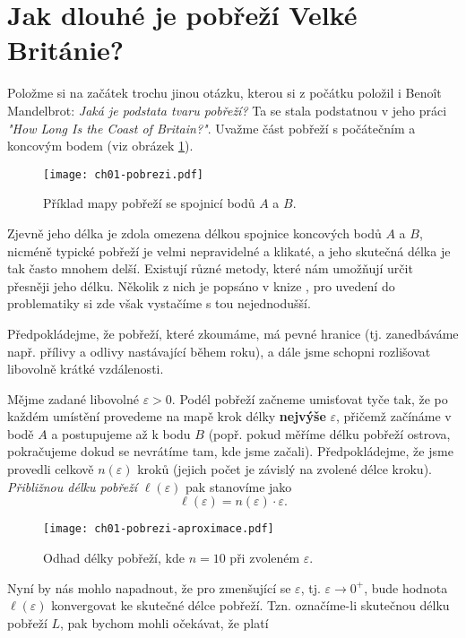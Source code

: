 \section{Jak dlouhé je pobřeží Velké Británie?}\label{sec:pobrezi_velke_britanie}
Položme si na začátek trochu jinou otázku, kterou si z počátku položil i Benoît Mandelbrot: \emph{Jaká je podstata tvaru pobřeží?} Ta se stala podstatnou v jeho práci \emph{"How Long Is the Coast of Britain?"}. Uvažme část pobřeží s počátečním a koncovým bodem (viz obrázek \ref{fig:pobrezi}).
\begin{figure}[h]
    \centering
    \texttt{[image: ch01-pobrezi.pdf]}
    \caption{Příklad mapy pobřeží se spojnicí bodů $A$ a $B$.}
    \label{fig:pobrezi}
\end{figure}
Zjevně jeho délka je zdola omezena délkou spojnice koncových bodů $A$ a $B$, nicméně typické pobřeží je velmi nepravidelné a klikaté, a jeho skutečná délka je tak často mnohem delší. Existují různé metody, které nám umožňují určit přesněji jeho délku. Několik z nich je popsáno v knize \citep[str. 79]{Mandelbrot1983}, pro uvedení do problematiky si zde však vystačíme s tou nejednodušší.\par
Předpokládejme, že pobřeží, které zkoumáme, má pevné hranice (tj. zanedbáváme např. přílivy a odlivy nastávající během roku), a dále jsme schopni rozlišovat libovolně krátké vzdálenosti.\par
Mějme zadané libovolné $\varepsilon>0$. Podél pobřeží začneme umisťovat tyče tak, že po každém umístění provedeme na mapě krok délky \textbf{nejvýše} $\varepsilon$, přičemž začínáme v bodě $A$ a postupujeme až k bodu $B$ (popř. pokud měříme délku pobřeží ostrova, pokračujeme dokud se nevrátíme tam, kde jsme začali). Předpokládejme, že jsme provedli celkově $n(\varepsilon)$ kroků (jejich počet je závislý na zvolené délce kroku). \emph{Přibližnou délku pobřeží} $\ell(\varepsilon)$ pak stanovíme jako
\begin{equation*}
    \ell(\varepsilon)=n(\varepsilon)\cdot\varepsilon.
\end{equation*}
\begin{figure}[h]
    \centering
    \texttt{[image: ch01-pobrezi-aproximace.pdf]}
    \caption{Odhad délky pobřeží, kde $n=10$ při zvoleném $\varepsilon$.}
    \label{fig:pobrezi_aproximace}
\end{figure}
Nyní by nás mohlo napadnout, že pro zmenšující se $\varepsilon$, tj. $\varepsilon\to0^+$, bude hodnota $\ell(\varepsilon)$ konvergovat ke skutečné délce pobřeží. Tzn. označíme-li skutečnou délku pobřeží $L$, pak bychom mohli očekávat, že platí
